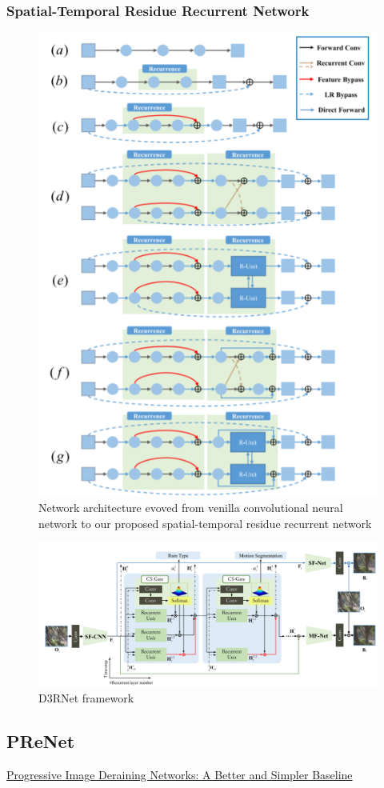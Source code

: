 \documentclass{article}
\begin{document}
\subsubsection{Spatial-Temporal Residue Recurrent Network}
\begin{figure}[H]
\centering
\includegraphics[width=\linewidth]{D3RNET}
\caption{Network architecture evoved from venilla convolutional neural network to our proposed spatial-temporal residue recurrent network}
\end{figure}
\begin{figure}[H]
\centering
\includegraphics[width=\linewidth]{D3RNET2}
\caption{D3RNet framework}
\end{figure}
\subsection{PReNet}
\href{https://csdwren.github.io/papers/PReNet_cvpr_camera.pdf}{Progressive Image Deraining Networks: A Better and Simpler Baseline}
\end{document}

